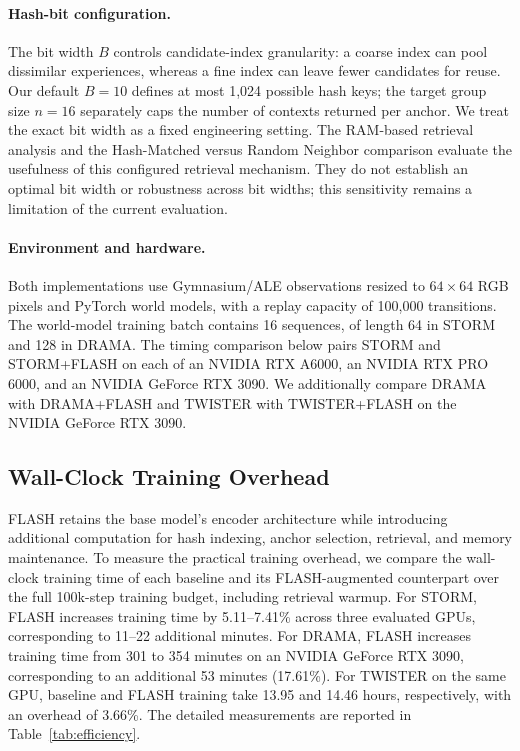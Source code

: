 \documentclass{article} %
\begin{document}
\paragraph{Hash-bit configuration.}
The bit width $B$ controls candidate-index granularity: a coarse index can pool dissimilar experiences, whereas a fine index can leave fewer candidates for reuse. Our default $B=10$ defines at most 1,024 possible hash keys; the target group size $n=16$ separately caps the number of contexts returned per anchor. We treat the exact bit width as a fixed engineering setting. The RAM-based retrieval analysis and the Hash-Matched versus Random Neighbor comparison evaluate the usefulness of this configured retrieval mechanism. They do not establish an optimal bit width or robustness across bit widths; this sensitivity remains a limitation of the current evaluation.

\paragraph{Environment and hardware.}
Both implementations use Gymnasium/ALE observations resized to $64\times64$ RGB pixels and PyTorch world models, with a replay capacity of 100,000 transitions. The world-model training batch contains 16 sequences, of length 64 in STORM and 128 in DRAMA. The timing comparison below pairs STORM and STORM+FLASH on each of an NVIDIA RTX A6000, an NVIDIA RTX PRO 6000, and an NVIDIA GeForce RTX 3090. We additionally compare DRAMA with DRAMA+FLASH and TWISTER with TWISTER+FLASH on the NVIDIA GeForce RTX 3090.

\subsection{Wall-Clock Training Overhead}
\label{app:wall_clock_overhead}

FLASH retains the base model's encoder architecture while introducing additional computation for hash indexing, anchor selection, retrieval, and memory maintenance. To measure the practical training overhead, we compare the wall-clock training time of each baseline and its FLASH-augmented counterpart over the full 100k-step training budget, including retrieval warmup. For STORM, FLASH increases training time by 5.11--7.41\% across three evaluated GPUs, corresponding to 11--22 additional minutes. For DRAMA, FLASH increases training time from 301 to 354 minutes on an NVIDIA GeForce RTX 3090, corresponding to an additional 53 minutes (17.61\%). For TWISTER on the same GPU, baseline and FLASH training take 13.95 and 14.46 hours, respectively, with an overhead of 3.66\%. The detailed measurements are reported in Table~\ref{tab:efficiency}.
\end{document}
